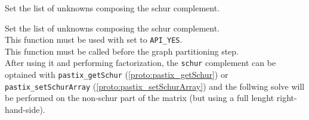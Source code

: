 \descript
    {
      Set the list of unknowns composing the schur complement.
    }
    {
      Set the list of unknowns composing the schur complement.\\
      This function must be used with  set to
      \texttt{API\_YES}.\\
      This function must be called before the graph partitioning step.\\
      After using it and performing factorization, the \texttt{schur}
      complement can be optained with \texttt{pastix\_getSchur}
      (\ref{proto:pastix_getSchur}) or \texttt{pastix\_setSchurArray}
      (\ref{proto:pastix_setSchurArray}) and the follwing solve 
      will be performed on the non-schur part of the matrix (but using
      a full lenght right-hand-side).
      
    }

